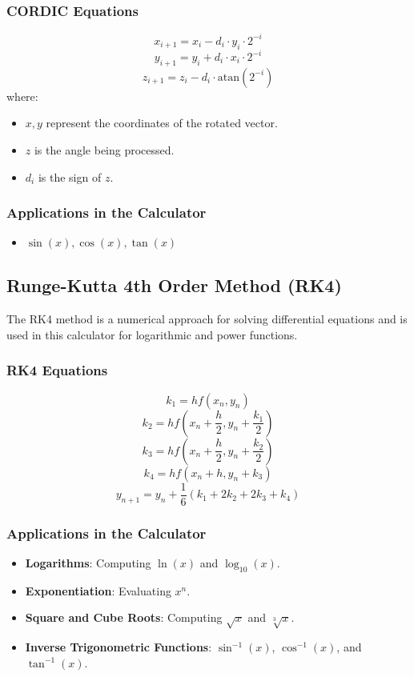\documentclass[a4paper,12pt]{article}
\begin{document}
\subsubsection{CORDIC Equations}
\[
x_{i+1} = x_i - d_i \cdot y_i \cdot 2^{-i}
\]
\[
y_{i+1} = y_i + d_i \cdot x_i \cdot 2^{-i}
\]
\[
z_{i+1} = z_i - d_i \cdot \text{atan}(2^{-i})
\]
where:
\begin{itemize}
    \item \( x, y \) represent the coordinates of the rotated vector.
    \item \( z \) is the angle being processed.
    \item \( d_i \) is the sign of \( z \).
\end{itemize}
\subsubsection{Applications in the Calculator}
\begin{itemize}
    \item $\sin(x) , \cos(x), \tan(x)$
\end{itemize}
\subsection{Runge-Kutta 4th Order Method (RK4)}
The RK4 method is a numerical approach for solving differential equations and is used in this calculator for logarithmic and power functions.

\subsubsection{RK4 Equations}
\[
k_1 = h f(x_n, y_n)
\]
\[
k_2 = h f(x_n + \frac{h}{2}, y_n + \frac{k_1}{2})
\]
\[
k_3 = h f(x_n + \frac{h}{2}, y_n + \frac{k_2}{2})
\]
\[
k_4 = h f(x_n + h, y_n + k_3)
\]
\[
y_{n+1} = y_n + \frac{1}{6} (k_1 + 2k_2 + 2k_3 + k_4)
\]

\subsubsection{Applications in the Calculator}
\begin{itemize}
    \item \textbf{Logarithms}: Computing \( \ln(x) \) and \( \log_{10}(x) \).
    \item \textbf{Exponentiation}: Evaluating \( x^n \).
    \item \textbf{Square and Cube Roots}: Computing \( \sqrt{x} \) and \( \sqrt[3]{x} \).
    \item \textbf{Inverse Trigonometric Functions}: \( \sin^{-1}(x) \), \( \cos^{-1}(x) \), and \( \tan^{-1}(x) \).
\end{itemize}
\end{document}
